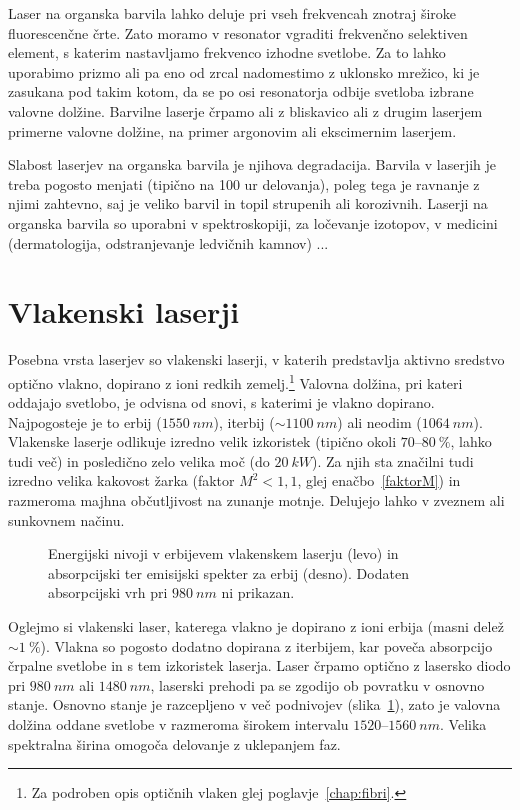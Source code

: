 Laser na organska barvila lahko deluje pri vseh frekvencah znotraj široke
fluorescenčne črte. Zato moramo v resonator vgraditi frekvenčno
selektiven element, s katerim nastavljamo frekvenco izhodne svetlobe. Za to lahko 
uporabimo prizmo ali pa eno od zrcal nadomestimo 
z uklonsko mrežico, ki je zasukana pod takim kotom, da se po osi resonatorja odbije svetloba
izbrane valovne dolžine.
Barvilne laserje črpamo ali z bliskavico ali z drugim laserjem primerne 
valovne dolžine, na primer argonovim ali ekscimernim laserjem. 

Slabost laserjev na organska barvila je njihova degradacija. Barvila v
laserjih je treba pogosto menjati (tipično na 100 ur delovanja), poleg tega je ravnanje
z njimi zahtevno, saj je veliko barvil in topil strupenih ali korozivnih.
Laserji na organska barvila so uporabni v spektroskopiji, za ločevanje izotopov, v 
medicini (dermatologija, odstranjevanje ledvičnih kamnov) ...
 
\section{Vlakenski laserji}
Posebna vrsta laserjev so vlakenski laserji, v katerih predstavlja aktivno 
sredstvo optično vlakno, dopirano z ioni redkih zemelj.\footnote{Za
podroben opis optičnih vlaken glej poglavje~\ref{chap:fibri}.}
Valovna dolžina, pri kateri oddajajo svetlobo, je odvisna od snovi, s katerimi
je vlakno dopirano. Najpogosteje je to erbij ($1550~\si{nm}$),
iterbij ($\sim 1100~\si{nm}$) ali neodim ($1064~\si{nm}$). 
Vlakenske laserje odlikuje
izredno velik izkoristek (tipično okoli $70$--$80~\%$, lahko tudi več) 
in posledično zelo velika moč (do $20~\si{kW}$). Za njih sta značilni tudi
izredno velika kakovost žarka (faktor $M^2<1,1$, glej enačbo~\ref{faktorM}) in 
razmeroma majhna občutljivost na zunanje motnje. Delujejo lahko v zveznem
ali sunkovnem načinu.

\begin{figure}[h]
\centering
\def\svgwidth{130truemm} 

\caption{Energijski nivoji v erbijevem vlakenskem laserju (levo) in 
absorpcijski ter emisijski spekter za erbij (desno). Dodaten absorpcijski 
vrh pri $980~\si{nm}$ ni prikazan.}
\label{fig:ErFib}
\end{figure} 

Oglejmo si vlakenski laser, katerega vlakno je dopirano z ioni erbija 
(masni delež $\sim 1~\%$). Vlakna so pogosto dodatno dopirana z iterbijem, kar
poveča absorpcijo črpalne svetlobe in s tem izkoristek laserja. Laser črpamo
optično z lasersko diodo pri $980~\si{nm}$ ali $1480~\si{nm}$, laserski prehodi 
pa se zgodijo ob povratku v osnovno stanje. Osnovno stanje je razcepljeno v več podnivojev
(slika~\ref{fig:ErFib}), zato je valovna dolžina oddane svetlobe v razmeroma 
širokem intervalu $1520$--$1560~\si{nm}$. Velika spektralna širina
omogoča delovanje z uklepanjem faz. 

